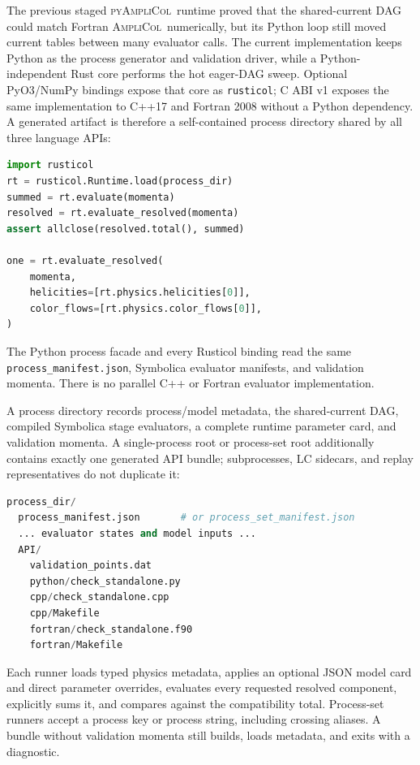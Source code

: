 \documentclass[10pt]{article}
\newcommand{\AC}{\textsc{AmpliCol}}
\newcommand{\PAC}{\textsc{pyAmpliCol}}
\begin{document}
The previous staged \PAC\ runtime proved that the shared-current DAG could
match Fortran \AC\ numerically, but its Python loop still moved current tables
between many evaluator calls.  The current implementation keeps Python as the
process generator and validation driver, while a Python-independent Rust core
performs the hot eager-DAG sweep.  Optional PyO3/NumPy bindings expose that core
as \texttt{rusticol}; C ABI v1 exposes the same implementation to C++17 and
Fortran 2008 without a Python dependency.  A generated artifact is therefore a
self-contained process directory shared by all three language APIs:
\begin{lstlisting}[language=Python]
import rusticol
rt = rusticol.Runtime.load(process_dir)
summed = rt.evaluate(momenta)
resolved = rt.evaluate_resolved(momenta)
assert allclose(resolved.total(), summed)

one = rt.evaluate_resolved(
    momenta,
    helicities=[rt.physics.helicities[0]],
    color_flows=[rt.physics.color_flows[0]],
)
\end{lstlisting}
The Python process facade and every Rusticol binding read the same
\texttt{process\_manifest.json}, Symbolica evaluator manifests, and validation
momenta.  There is no parallel C++ or Fortran evaluator implementation.

A process directory records process/model metadata, the shared-current DAG,
compiled Symbolica stage evaluators, a complete runtime parameter card, and
validation momenta.  A single-process root or process-set root additionally
contains exactly one generated API bundle; subprocesses, LC sidecars, and
replay representatives do not duplicate it:

\begin{lstlisting}[language=Python]
process_dir/
  process_manifest.json       # or process_set_manifest.json
  ... evaluator states and model inputs ...
  API/
    validation_points.dat
    python/check_standalone.py
    cpp/check_standalone.cpp
    cpp/Makefile
    fortran/check_standalone.f90
    fortran/Makefile
\end{lstlisting}

Each runner loads typed physics metadata, applies an optional JSON model card
and direct parameter overrides, evaluates every requested resolved component,
explicitly sums it, and compares against the compatibility total.  Process-set
runners accept a process key or process string, including crossing aliases.  A
bundle without validation momenta still builds, loads metadata, and exits with
a diagnostic.
\end{document}
